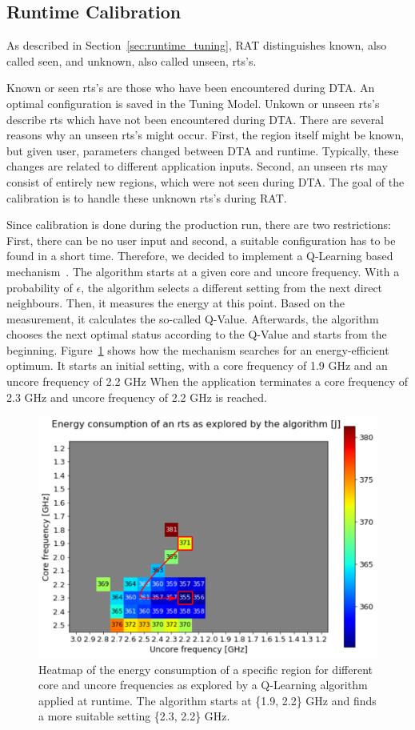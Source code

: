 \subsection{Runtime Calibration} \label{sec:calibration}

As described in Section~\ref{sec:runtime_tuning}, RAT distinguishes known, also called seen, and unknown, also called unseen, rts's.

Known or seen rts's are those who have been encountered during DTA.
An optimal configuration is saved in the Tuning Model.
Unkown or unseen rts's describe rts which have not been encountered during DTA.
There are several reasons why an unseen rts's might occur.
First, the region itself might be known, but given user, parameters changed between DTA and runtime.
Typically, these changes are related to different application inputs.
Second, an unseen rts may consist of entirely new regions, which were not seen during DTA.
The goal of the calibration is to handle these unknown rts's during RAT.

Since calibration is done during the production run, there are two restrictions:
First, there can be no user input and second, a suitable configuration has to be found in a short time.
Therefore, we decided to implement a Q-Learning based mechanism~\cite{Gocht2019a}.
The algorithm starts at a given core and uncore frequency.
With a probability of {$\epsilon$}, the algorithm selects a different setting from the next direct neighbours.
Then, it measures the energy at this point.
Based on the measurement, it calculates the so-called Q-Value.
Afterwards, the algorithm chooses the next optimal status according to the Q-Value and starts from the beginning.
Figure~\ref{fig:qlearning} shows how the mechanism searches for an energy-efficient optimum.
It starts an initial setting, with a core frequency of 1.9 GHz and an uncore frequency of 2.2 GHz
When the application terminates a core frequency of 2.3 GHz and uncore frequency of 2.2 GHz is reached.

\begin{figure}[!t]
\centering
\includegraphics[width=.8\columnwidth]{figures/q_learning.png}
\caption{Heatmap of the energy consumption of a specific region for different core and uncore frequencies as explored by a Q-Learning algorithm applied at runtime.
The algorithm starts at \{1.9, 2.2\} GHz and finds a more suitable setting \{2.3, 2.2\} GHz.}
\label{fig:qlearning}
\end{figure}

